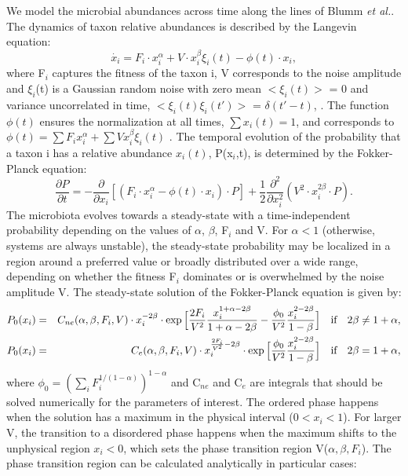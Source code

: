 \documentclass[12pt]{article}
\begin{document}
We model the microbial abundances across time along the lines of Blumm \textit{et al.}\cite{ranking}. The dynamics of taxon relative abundances is described by the Langevin equation: 
\begin{equation}
\dot{x_i} = F_i \cdot x_i^\alpha + V \cdot x_i^\beta \xi_i(t) - \phi(t) \cdot x_i,
\end{equation}
where F$_i$ captures the fitness of the taxon i, V corresponds to the noise amplitude and $\xi_i$(t) is a Gaussian random noise with zero mean  $<\xi_i(t)>$ = 0 and variance uncorrelated in time, $<\xi_i(t) \xi_i(t')>$ =  $\delta(t'-t)$, . The function $\phi(t)$ ensures the normalization at all times, $\sum x_i(t) = 1$, and corresponds to $\phi(t) = \sum F_i x_i^\alpha + \sum V x_i^\beta \xi_i(t)$ .
The temporal evolution of the probability that a taxon i has a relative abundance $x_i(t)$, P(x$_i$,t), is determined by the Fokker-Planck equation:
\begin{equation}
\frac{\partial P}{\partial t} = - \frac{\partial}{\partial x_i}  [(F_i \cdot x_i^\alpha - \phi(t) \cdot x_i ) \cdot P]+ \frac{1}{2} \frac{\partial^2}{\partial x_i^2} (V^2 \cdot x_i^{2\beta}\cdot P).
\end{equation}
The microbiota evolves towards a steady-state with a time-independent probability depending on the values of $\alpha$, $\beta$, F$_i$ and V. For $\alpha<1$ (otherwise, systems are always unstable), the steady-state probability may be localized in a region around a preferred value or broadly distributed over a wide range, depending on whether the fitness F$_i$  dominates or is overwhelmed by the noise amplitude V. The steady-state solution of the Fokker-Planck equation is given by:
\begin{eqnarray}
P_0 (x_i) &=& C_{ne}(\alpha,\beta,F_i,V)  \cdot x_i^{-2\beta}  \cdot \exp\Big[\frac{2F_i}{V^2}\frac{x_i^{1+\alpha-2\beta}}{1+\alpha-2\beta}-\frac{\phi_0}{V^2}\frac{x_i^{2-2\beta}}{1-\beta}\Big] \quad \textrm{if} \quad  2\beta \ne 1+\alpha, \notag \\
P_0 (x_i) &=& C_e(\alpha,\beta,F_i,V)  \cdot x_i^{\frac{2F_i}{V^2} -2\beta}  \cdot \exp\Big[\frac{\phi_0}{V^2}\frac{x_i^{2-2\beta}}{1-\beta}\Big] \quad \textrm{if} \quad  2\beta = 1+\alpha,
\notag
\end{eqnarray}
where $\phi_0 = (\sum_i F_i^{1/(1-\alpha)})^{1-\alpha}$ and C$_{ne}$ and C$_{e}$ are integrals that should be solved numerically for the parameters of interest. The ordered phase happens when the solution has a maximum in the physical interval ($0<x_i<1$). For larger V, the transition to a disordered phase happens when the maximum shifts to the unphysical region $x_i<0$, which sets the phase transition region V($\alpha,\beta,F_i$). The phase transition region can be calculated analytically in particular cases:
\end{document}

